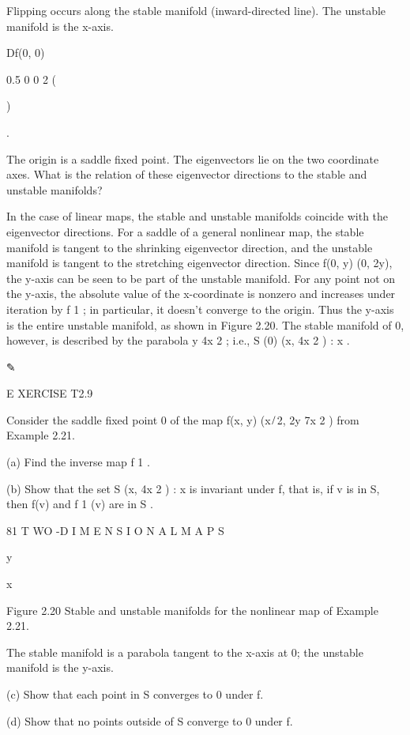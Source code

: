 \documentclass[12pt]{article}
\begin{document}
Flipping occurs along the stable manifold (inward-directed line). The unstable manifold is the x-axis.

Df(0, 0) 

0.5 0 0 2 (

)

.

The origin is a saddle ﬁxed point. The eigenvectors lie on the two coordinate axes. What is the relation of these eigenvector 
directions to the stable and unstable manifolds?

In the case of linear maps, the stable and unstable manifolds coincide with the eigenvector directions. For a saddle of a general 
nonlinear map, the stable manifold is tangent to the shrinking eigenvector direction, and the unstable manifold is tangent to the 
stretching eigenvector direction. Since f(0, y)  (0, 2y), the y-axis can be seen to be part of the unstable manifold. For any point 
not on the y-axis, the absolute value of the x-coordinate is nonzero and increases under iteration by f 1 ; in particular, it doesn’t 
converge to the origin. Thus the y-axis is the entire unstable manifold, as shown in Figure 2.20. The stable manifold of 0, however, 
is described by the parabola y  4x 2 ; i.e., S (0)   (x, 4x 2 ) : x    .

✎

E XERCISE T2.9

Consider the saddle ﬁxed point 0 of the map f(x, y)  (x ̸ 2, 2y  7x 2 ) from Example 2.21.

(a) Find the inverse map f 1 .

(b) Show that the set S   (x, 4x 2 ) : x    is invariant under f, that is, if v is in S, then f(v) and f 1 (v) are in S .

81 T WO -D I M E N S I O N A L M A P S

y

x

Figure 2.20 Stable and unstable manifolds for the nonlinear map of Example 2.21.

The stable manifold is a parabola tangent to the x-axis at 0; the unstable manifold is the y-axis.

(c) Show that each point in S converges to 0 under f.

(d) Show that no points outside of S converge to 0 under f.
\end{document}
